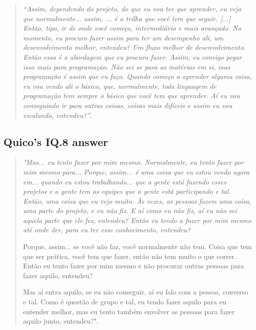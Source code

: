 \begin{quote}
    \itshape
    “Assim, dependendo do projeto, do que eu vou ter que aprender, eu vejo que normalmente... assim, ... é a trilha que você tem que seguir. [...] Então, tipo, ir de onde você começa, intermediário e mais avançado. No momento, eu procuro fazer assim para ter um desempenho ali, um desenvolvimento melhor, entendeu? Um fluxo melhor de desenvolvimento. Então essa é a abordagem que eu procuro fazer. Assim, eu consigo pegar isso mais para programação. Não sei se para as matérias em si, mas programação é assim que eu faço. Quando começo a aprender alguma coisa, eu vou vendo ali o básico, que, normalmente, toda linguagem de programação tem sempre o básico que você tem que aprender. Aí eu vou conseguindo ir para outras coisas, coisas mais difíceis e assim eu vou escalando, entendeu?”.
\end{quote}


\subsection{Quico’s IQ.8 answer}
\label{interview-exc-ss:quico-iq8}

\begin{quote}
    \itshape
    "Mas... eu tento fazer por mim mesmo. Normalmente, eu tento fazer por mim mesmo para... Porque, assim... é uma coisa que eu estou vendo agora em... quando eu estou trabalhando... que a gente está fazendo esses projetos e a gente tem as equipes que a gente está participando e tal. Então, uma coisa que eu vejo muito. Às vezes, as pessoas fazem uma coisa, uma parte do projeto, e eu não fiz. E aí como eu não fiz, aí eu não sei aquela parte que ele fez, entendeu? Então eu tendo a fazer por mim mesmo até onde der, para eu ter esse conhecimento, entendeu?

    Porque, assim... se você não faz, você normalmente não tem. Coisa que tem que ser prática, você tem que fazer, então não tem muito o que correr. Então eu tento fazer por mim mesmo e não procurar outras pessoas para fazer aquilo, entendeu? 
    
    Mas aí entra aquilo, se eu não conseguir, aí eu falo com a pessoa, converso e tal. Como é questão de grupo e tal, eu tendo fazer aquilo para eu entender melhor, mas eu tento também envolver as pessoas para fazer aquilo junto, entendeu?".
\end{quote}

